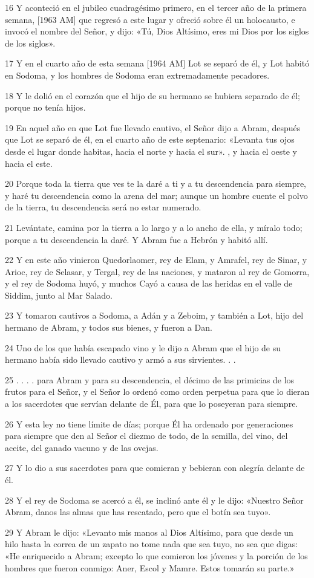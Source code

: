 \par 16 Y aconteció en el jubileo cuadragésimo primero, en el tercer año de la primera semana, [1963 AM] que regresó a este lugar y ofreció sobre él un holocausto, e invocó el nombre del Señor, y dijo: «Tú, Dios Altísimo, eres mi Dios por los siglos de los siglos».
\par 17 Y en el cuarto año de esta semana [1964 AM] Lot se separó de él, y Lot habitó en Sodoma, y ​​los hombres de Sodoma eran extremadamente pecadores.
\par 18 Y le dolió en el corazón que el hijo de su hermano se hubiera separado de él; porque no tenía hijos.
\par 19 En aquel año en que Lot fue llevado cautivo, el Señor dijo a Abram, después que Lot se separó de él, en el cuarto año de este septenario: «Levanta tus ojos desde el lugar donde habitas, hacia el norte y hacia el sur». , y hacia el oeste y hacia el este.
\par 20 Porque toda la tierra que ves te la daré a ti y a tu descendencia para siempre, y haré tu descendencia como la arena del mar; aunque un hombre cuente el polvo de la tierra, tu descendencia será no estar numerado.
\par 21 Levántate, camina por la tierra a lo largo y a lo ancho de ella, y míralo todo; porque a tu descendencia la daré. Y Abram fue a Hebrón y habitó allí.
\par 22 Y en este año vinieron Quedorlaomer, rey de Elam, y Amrafel, rey de Sinar, y Arioc, rey de Selasar, y Tergal, rey de las naciones, y mataron al rey de Gomorra, y el rey de Sodoma huyó, y muchos Cayó a causa de las heridas en el valle de Siddim, junto al Mar Salado.
\par 23 Y tomaron cautivos a Sodoma, a Adán y a Zeboim, y también a Lot, hijo del hermano de Abram, y todos sus bienes, y fueron a Dan.
\par 24 Uno de los que había escapado vino y le dijo a Abram que el hijo de su hermano había sido llevado cautivo y armó a sus sirvientes. . .
\par 25 . . . . para Abram y para su descendencia, el décimo de las primicias de los frutos para el Señor, y el Señor lo ordenó como orden perpetua para que lo dieran a los sacerdotes que servían delante de Él, para que lo poseyeran para siempre.
\par 26 Y esta ley no tiene límite de días; porque Él ha ordenado por generaciones para siempre que den al Señor el diezmo de todo, de la semilla, del vino, del aceite, del ganado vacuno y de las ovejas.
\par 27 Y lo dio a sus sacerdotes para que comieran y bebieran con alegría delante de él.
\par 28 Y el rey de Sodoma se acercó a él, se inclinó ante él y le dijo: «Nuestro Señor Abram, danos las almas que has rescatado, pero que el botín sea tuyo».
\par 29 Y Abram le dijo: «Levanto mis manos al Dios Altísimo, para que desde un hilo hasta la correa de un zapato no tome nada que sea tuyo, no sea que digas: «He enriquecido a Abram; excepto lo que comieron los jóvenes y la porción de los hombres que fueron conmigo: Aner, Escol y Mamre. Estos tomarán su parte.»

